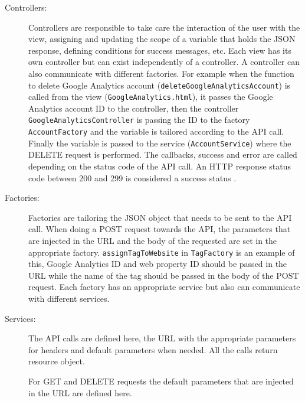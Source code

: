 \begin{description}
\item[Controllers:] 
Controllers are responsible to take care the  interaction of the user with the view, assigning and updating the scope of a variable that holds the JSON response, defining conditions for success messages, etc. Each view has its own controller but can exist independently of a controller. A controller can also communicate with different factories.
For example when the function to delete Google Analytics account (\texttt{deleteGoogleAnalyticsAccount}) is called from the view (\texttt{GoogleAnalytics.html}), it passes the Google Analytics account ID to the controller, then the controller \texttt{GoogleAnalyticsController} is passing the ID to the factory \texttt{AccountFactory} and the variable is tailored according to the API call. Finally the variable is passed to the service (\texttt{AccountService}) where the DELETE request is performed. %
The callbacks, success and error are called depending on the status code of the API call. An HTTP response status code between 200 and 299 is considered a success status \cite{Angul36:online}.


\item[Factories:] Factories are tailoring the JSON object that needs to be sent to the API call. 
When doing a POST request towards the API, the parameters that are injected in the URL and the body of the requested are set in the appropriate factory. \texttt{assignTagToWebsite} in \texttt{TagFactory} is an example of this, Google Analytics ID and web property ID should be passed in the URL while the name of the tag should be passed in the body of the POST request. %
Each factory has an appropriate service but also can communicate with different services.

\item[Services:] The API calls are defined here, the URL with the appropriate parameters for headers and default parameters when needed. All the calls return resource object. %

For GET and DELETE requests the default parameters that are injected in the URL are defined here. %


\end{description}
